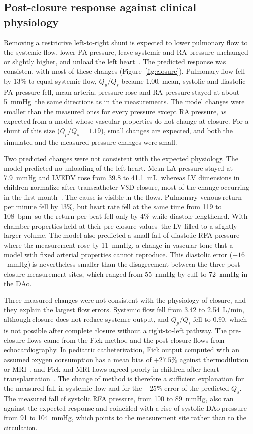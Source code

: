 \subsection{Post-closure response against clinical physiology}
\label{sec:disc_closure}
Removing a restrictive left-to-right shunt is expected to lower pulmonary flow to the systemic flow, lower PA pressure, leave systemic and RA pressure unchanged or slightly higher, and unload the left heart~\cite{Rao2024,Yuan2025}. The predicted response was consistent with most of these changes (Figure~\ref{fig:closure}). Pulmonary flow fell by 13\% to equal systemic flow, $Q_p/Q_s$ became 1.00, mean, systolic and diastolic PA pressure fell, mean arterial pressure rose and RA pressure stayed at about 5~mmHg, the same directions as in the measurements. The model changes were smaller than the measured ones for every pressure except RA pressure, as expected from a model whose vascular properties do not change at closure. For a shunt of this size ($Q_p/Q_s = 1.19$), small changes are expected, and both the simulated and the measured pressure changes were small.

Two predicted changes were not consistent with the expected physiology. The model predicted no unloading of the left heart. Mean LA pressure stayed at 7.9~mmHg and LVEDV rose from 39.8 to 41.1~mL, whereas LV dimensions in children normalize after transcatheter VSD closure, most of the change occurring in the first month~\cite{Yuan2025}. The cause is visible in the flows. Pulmonary venous return per minute fell by 13\%, but heart rate fell at the same time from 119 to 108~bpm, so the return per beat fell only by 4\% while diastole lengthened. With chamber properties held at their pre-closure values, the LV filled to a slightly larger volume. The model also predicted a small fall of diastolic RFA pressure where the measurement rose by 11~mmHg, a change in vascular tone that a model with fixed arterial properties cannot reproduce. This diastolic error ($-16$~mmHg) is nevertheless smaller than the disagreement between the three post-closure measurement sites, which ranged from 55~mmHg by cuff to 72~mmHg in the DAo.

Three measured changes were not consistent with the physiology of closure, and they explain the largest flow errors. Systemic flow fell from 3.42 to 2.54~L/min, although closure does not reduce systemic output, and $Q_p/Q_s$ fell to 0.90, which is not possible after complete closure without a right-to-left pathway. The pre-closure flows came from the Fick method and the post-closure flows from echocardiography. In pediatric catheterization, Fick output computed with an assumed oxygen consumption has a mean bias of $+27.5\%$ against thermodilution or MRI~\cite{Ralston2023}, and Fick and MRI flows agreed poorly in children after heart transplantation~\cite{Schramm2023}. The change of method is therefore a sufficient explanation for the measured fall in systemic flow and for the $+25\%$ error of the predicted $Q_s$. The measured fall of systolic RFA pressure, from 100 to 89~mmHg, also ran against the expected response and coincided with a rise of systolic DAo pressure from 91 to 104~mmHg, which points to the measurement site rather than to the circulation.

